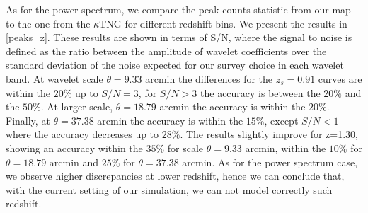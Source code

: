 \documentclass[twocolumn,twocolappendix]{aastex63}
\begin{document}
As for the power spectrum, we compare the peak counts statistic from our map to the one from the $\kappa$TNG for different redshift bins. We present the results in \autoref{peaks_z}. These results are shown in terms of S/N, where the signal to noise is defined as the ratio between the amplitude of wavelet coefficients over the standard deviation of the noise expected for our survey choice in each wavelet band.
At wavelet scale $\theta=9.33$ arcmin the differences for the $z_s=0.91$ curves are within the $20\%$ up to $S/N=3$, for $S/N>3$ the accuracy is between the $20\%$ and the $50\%$. At larger scale, $\theta=18.79$ arcmin the accuracy is within the $20\%$. Finally, at $\theta=37.38$ arcmin the accuracy is within the $15\%$, except $S/N<1$ where the accuracy decreases up to $28\%$.
The results slightly improve for z=1.30, showing an accuracy within the $35\%$ for scale $\theta=9.33$ arcmin,  within the $10\%$ for $\theta=18.79$ arcmin and $25\%$ for $\theta=37.38$ arcmin.
 As for the power spectrum case, we observe higher discrepancies at lower redshift, hence we can conclude that, with the current setting of our simulation, we can not model correctly such redshift.
\end{document}
